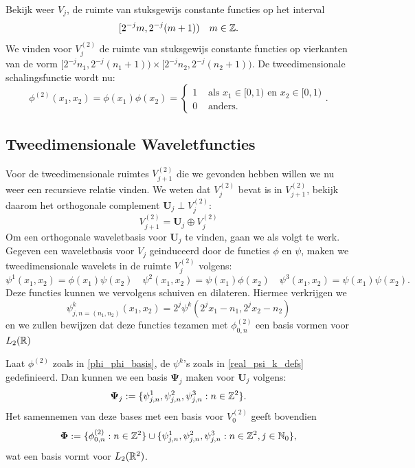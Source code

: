 \begin{voorbeeld}
Bekijk weer $V_j$, de ruimte van stuksgewijs constante functies op het interval 
\[
 [2^{-j} m, 2^{-j}(m+1) ) \quad m \in \mathbb{Z}.
\] 
We vinden voor $V_j^{(2)}$ de ruimte van stuksgewijs constante functies op vierkanten van de vorm 
$[2^{-j}n_1, 2^{-j}(n_1+1)) \times [2^{-j}n_2, 2^{-j}(n_2+1))$. 
De tweedimensionale schalingsfunctie wordt nu:
\[
	\phi^{(2)}(x_1,x_2) = \phi(x_1)\phi(x_2) = 
\begin{cases} 1 & \text{ als } x_1 \in [0,1)\text{ en }x_2 \in [0,1) \\ 0 & \text{ anders.} \end{cases}.
\]
\end{voorbeeld}

\subsection{Tweedimensionale Waveletfuncties}
Voor de tweedimensionale ruimtes $V^{(2)}_{j+1}$ die we gevonden hebben willen we nu weer een recursieve
relatie vinden. We weten dat $V_j^{(2)}$ bevat is in $V_{j+1}^{(2)}$, bekijk daarom het orthogonale complement 
$\boldsymbol{U}_j \perp V_j^{(2)}$:
\begin{equation}
  \label{2d_ruimte_rec}
  V_{j+1}^{(2)} =  \boldsymbol{U}_j \oplus V_j^{(2)}
\end{equation}
Om een orthogonale waveletbasis voor $\boldsymbol{U}_j$ te vinden, gaan we als volgt te werk.
Gegeven een waveletbasis voor $V_j$ geinduceerd door de functies $\phi$ en $\psi$, maken we
tweedimensionale wavelets in de ruimte $V_j^{(2)}$ volgens:
\begin{equation}
  \label{psi_k_defs}
  \psi^1(x_1,x_2) = \phi(x_1)\psi(x_2) 
  \quad \psi^2(x_1,x_2) = \psi(x_1) \phi(x_2) 
  \quad \psi^3(x_1,x_2) = \psi(x_1)\psi(x_2).
\end{equation}
Deze functies kunnen we vervolgens schuiven en dilateren. Hiermee verkrijgen we
\begin{equation}
  \label{real_psi_k_defs}
\psi^k_{j,n=(n_1,n_2)}(x_1,x_2) = 2^j \psi^k\left( 2^jx_1 - n_1, 2^j x_2 - n_2 \right)
\end{equation}
en we zullen bewijzen dat deze functies tezamen met $\phi^{(2)}_{0,n}$ een basis vormen voor $L_2(\mathbb{R})$
\begin{stelling}
  \label{mallatbasis}
  Laat $\phi^{(2)}$ zoals in \eqref{phi_phi_basis}, de $\psi^k$'s zoals in \eqref{real_psi_k_defs} gedefinieerd.
  Dan kunnen we een basis $\boldsymbol{\Psi}_j$ maken voor $\boldsymbol{U}_j$ volgens:
  \[
  \boldsymbol\Psi_j := \{ \psi^1_{j,n}, \psi^2_{j,n}, \psi^3_{j,n}: n \in \mathbb{Z}^2 \}.
  \] 
  Het samennemen van deze bases met een basis voor $V_0^{(2)}$ geeft bovendien 
  \[
  \boldsymbol\Phi := \{ \phi^{(2)}_{0, n}: n \in \mathbb{Z}^2 \} \cup \{ \psi^1_{j,n}, \psi^2_{j,n}, \psi^3_{j,n}: n \in \mathbb{Z}^2, j \in \mathbb{N}_0 \},
  \] 
  wat een basis vormt voor $L_2(\mathbb{R}^2)$.
\end{stelling}

